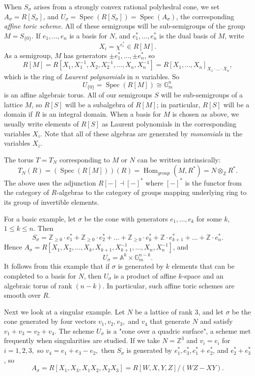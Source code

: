 \documentclass[10pt,a4paper]{book}
\newcommand{\on}{\operatorname}
\newcommand{\s}{\on{Spec}}
\begin{document}
When $S_\sigma$ arises from a strongly convex rational polyhedral cone, we set $A_\sigma = R[S_\sigma]$, and $U_\sigma = \s (R[S_\sigma]) = \s (A_\sigma)$, the corresponding \textit{affine toric scheme}. All of these semigroups will be sub-semigroups of the group $M = S_{\{0\}}$. If $e_1,..., e_n$ is a basis for $N$, and $e_1^*,..., e_n^*$ is the dual basis of $M$, write 
\[
X_i = \chi^{e_i^*} \in R[M].
\]
As a semigroup, $M$ has generators $\pm e_1^*, ..., \pm e_n^*$, so
\[
R[M] = R[X_1,X_1^{-1},X_2,X_2^{-1},... ,X_n, X_n^{-1}] = R[X_1,...,X_n]_{X_1\cdot... \cdot X_n},
\]
which is the ring of \textit{Laurent polynomials} in $n$ variables. So
\[
U_{\{0\}} = \s (R[M])\cong \mathbb{G}_m^n
\]
is an affine algebraic torus. All of our semigroups $S$ will be sub-semigroups of a lattice $M$, so $R[S]$ will be a subalgebra of $R[M]$; in particular, $R[S]$ will be a domain if $R$ is an integral domain. When a basis for $M$ is chosen as above, we usually write elements of $R[S]$ as Laurent polynomials in the corresponding variables $X_i$. Note that all of these algebras are generated by \textit{monomials} in the variables $X_i$.

The torus $T = T_N$ corresponding to $M$ or $N$ can be written intrinsically:
\[
T_N(R) = (\s (R[M]))(R) = \on{Hom}_{group}(M,R^*) = N\otimes_\mathbb{Z}R^*.
\]
The above uses the adjunction $R[-]\dashv [-]^*$ where $[-]^*$ is the functor from the category of $R$-algebras to the category of groups mapping underlying ring to its group of invertible elements.

For a basic example, let $\sigma$ be the cone with generators $e_1,..., e_k$ for some $k$, $1 \leq k \leq n$. Then
\[
S_\sigma = \mathbb{Z}_{\geq 0}\cdot e_1^* + \mathbb{Z}_{\geq 0}\cdot e_2^* + ... + \mathbb{Z}_{\geq 0}\cdot e_k^* + \mathbb{Z}\cdot e_{k+1}^* + ... + \mathbb{Z}\cdot e_n^*.
\]
Hence $A_\sigma = R[X_1, X_2, ..., X_k, X_{k+1}, X_{k+1}^{-1}, ..., X_n, X_n^{-1}]$, and
\[
U_\sigma = \mathbb{A}^k \times \mathbb{G}_m^{n-k}.
\]
It follows from this example that if $\sigma$ is generated by $k$ elements that can be completed to a basis for $N$, then $U_\sigma$ is a product of affine $k$-space and an algebraic torus of rank $(n-k)$. In particular, such affine toric schemes are smooth over $R$.

Next we look at a singular example. Let $N$ be a lattice of rank $3$, and let $\sigma$ be the cone generated by four vectors $v_1, v_2, v_3,$ and $v_4$ that generate $N$ and satisfy $v_1 + v_3 = v_2 + v_4$. The scheme $U_\sigma$ is a "cone over a quadric surface", a scheme met frequently when
singularities are studied. If we take $N = \mathbb{Z}^3$ and $v_i = e_i$ for $i = 1, 2, 3,$ so $v_4 = e_1 + e_3 - e_2,$ then $S_\sigma$ is generated by $e_1^*, e_3^*, e_1^*+e_2^*$, and $e_2^*+e_3^*$, so
\[
A_\sigma = R[X_1,X_3, X_1X_2, X_2X_3] = R[W,X,Y,Z]/(WZ-XY).
\]
\end{document}
